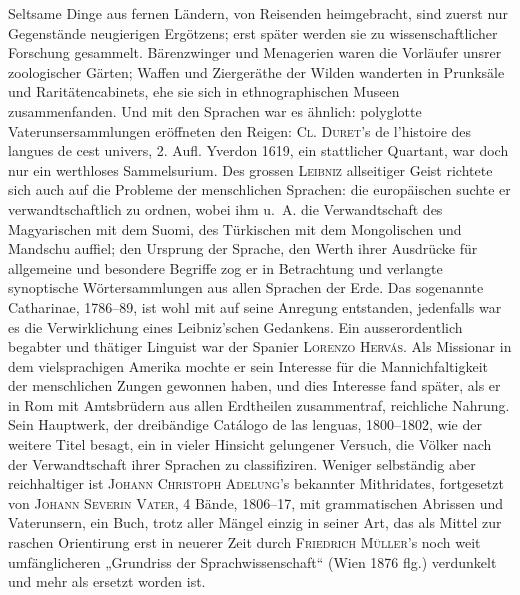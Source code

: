 \label{I.IV.polyglotten}
Seltsame Dinge aus fernen Ländern, von Reisenden heimgebracht, sind zuerst nur Gegenstände neugierigen Ergötzens; erst später werden sie zu wissenschaftlicher Forschung gesammelt. Bärenzwinger und Menagerien waren die Vorläufer unsrer zoologischer Gärten; Waffen und Ziergeräthe der Wilden wanderten in Prunksäle und Raritätencabinets, ehe sie sich in ethnographischen Museen zusammenfanden. Und mit den Sprachen war es ähnlich: polyglotte Vaterunsersammlungen eröffneten den Reigen: \textsc{Cl. }\textsc{Duret}’s  de l’histoire des langues de cest univers, 2. Aufl. Yverdon 1619, ein stattlicher Quartant, war doch nur ein werthloses Sammelsurium. Des grossen \textsc{Leibniz} allseitiger Geist richtete sich auch auf die Probleme der menschlichen Sprachen: die europäischen suchte er verwandtschaftlich zu ordnen, wobei ihm u.~A. die Verwandtschaft des Magyarischen mit dem Suomi, des Türkischen mit dem Mongolischen und Mandschu auffiel; den Ursprung der Sprache, den Werth ihrer Ausdrücke für allgemeine und besondere Begriffe zog er in Betrachtung und verlangte synoptische Wörtersammlungen aus allen Sprachen der Erde. Das sogenannte  Catharinae, 1786–89, ist wohl mit auf seine Anregung entstanden, jedenfalls war es die Verwirklichung eines Leibniz’schen Gedankens. Ein ausserordent\-\label{fp.28}lich begabter und thätiger Linguist war der Spanier \textsc{Lorenzo Hervás}. Als Missionar in dem vielsprachigen Amerika mochte er sein Interesse für die Mannichfaltigkeit der \label{sp.28} menschlichen Zungen gewonnen haben, und dies Interesse fand später, als er in Rom mit Amtsbrüdern aus allen Erdtheilen zusammentraf, reichliche Nahrung. Sein Hauptwerk, der dreibändige Catálogo de las lenguas, 1800–1802,  wie der weitere Titel besagt, ein in vieler Hinsicht gelungener Versuch, die Völker nach der Verwandtschaft ihrer Sprachen zu classifiziren. Weniger selbständig aber reichhaltiger ist \textsc{Johann Christoph Adelung}’s bekannter Mithridates, fortgesetzt von \textsc{Johann Severin Vater}, 4 Bände, 1806–17, mit grammatischen Abrissen und Vaterunsern, ein Buch, trotz aller Mängel einzig in seiner Art, das als Mittel zur raschen Orientirung erst in neuerer Zeit durch \textsc{Friedrich Müller}’s noch weit umfänglicheren „Grundriss der Sprachwissenschaft“ (Wien 1876 flg.) verdunkelt und mehr als ersetzt worden ist.

